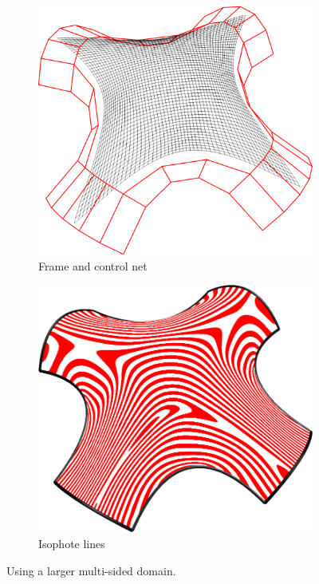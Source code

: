 \documentclass{article}
\begin{document}
\begin{figure}[h!]
  \centering
  \begin{subfigure}{0.3\textwidth}
    \includegraphics[width = \textwidth]{images/8sided-cnet.png}
    \caption{Frame and control net}
    \label{fig:8sided-cnet}
  \end{subfigure}
  \hspace{3cm}
  \begin{subfigure}{0.3\textwidth}
    \includegraphics[width = \textwidth]{images/8sided-iso.png}
    \caption{Isophote lines}
    \label{fig:8sided-iso}
  \end{subfigure}

  \caption{Using a larger multi-sided domain.}
  \label{fig:8sided}
\end{figure}
\end{document}
